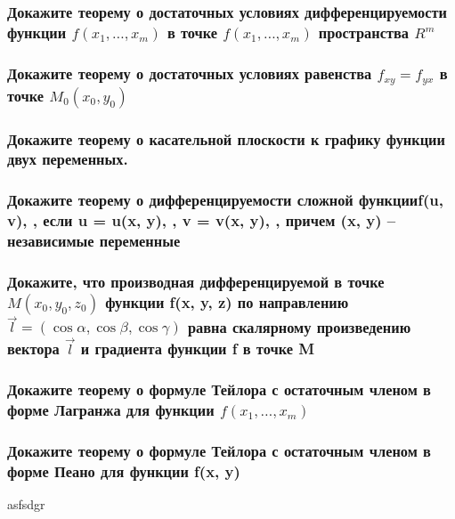 \documentclass[a4paper, 12pt]{article}
\newcommand{\Rm}{\texorpdfstring{$R^m$}{Lg}}
\def\newline{}%
\begin{document}
            \subsubsection{Докажите теорему о достаточных условиях дифференцируемости функции \texorpdfstring{$f(x_1, \ldots, x_m)$}{Lg} в точке \texorpdfstring{$f(x_1, \ldots, x_m)$}{Lg} пространства \Rm}



            \subsubsection{Докажите теорему о достаточных условиях равенства \texorpdfstring{$f_{xy} = f_{yx}$}{Lg} в точке \texorpdfstring{$M_0(x_0, y_0)$}{Lg}}



            \subsubsection{Докажите теорему о касательной плоскости к графику функции двух переменных.}



            \subsubsection{Докажите теорему о дифференцируемости сложной функции\newline f(u, v), , если u = u(x, y), , v = v(x, y), , причем (x, y) -- независимые переменные}



            \subsubsection{Докажите, что производная дифференцируемой в точке\newline \texorpdfstring{$M(x_0, y_0, z_0)$}{Lg} функции f(x, y, z) по направлению \texorpdfstring{$\vec{l} = (\cos\alpha, \cos \beta, \cos \gamma)$}{Lg}
            равна скалярному произведению вектора \texorpdfstring{$\vec{l}$}{Lg} и градиента функции f в точке M}



            \subsubsection{Докажите теорему о формуле Тейлора с остаточным членом в форме Лагранжа для функции \texorpdfstring{$f(x_1, \ldots, x_m)$}{Lg}}



            \subsubsection{Докажите теорему о формуле Тейлора с остаточным членом в форме Пеано для функции f(x, y)}


            asfsdgr
\end{document}
